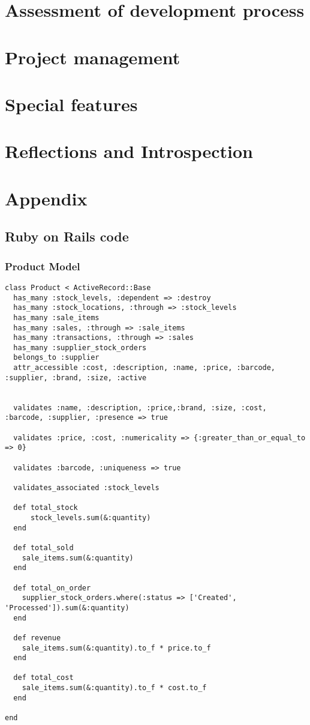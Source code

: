 \documentclass[a4paper]{article}
\begin{document}
\section{Assessment of development process}
\pagebreak
\section{Project management}
\pagebreak
\section{Special features}
\pagebreak
\section{Reflections and Introspection}
\pagebreak


\section{Appendix}






\subsection{Ruby on Rails code}

\subsubsection{Product Model}
\begin{verbatim}
class Product < ActiveRecord::Base
  has_many :stock_levels, :dependent => :destroy
  has_many :stock_locations, :through => :stock_levels
  has_many :sale_items
  has_many :sales, :through => :sale_items
  has_many :transactions, :through => :sales
  has_many :supplier_stock_orders
  belongs_to :supplier
  attr_accessible :cost, :description, :name, :price, :barcode, :supplier, :brand, :size, :active


  validates :name, :description, :price,:brand, :size, :cost, :barcode, :supplier, :presence => true

  validates :price, :cost, :numericality => {:greater_than_or_equal_to => 0}

  validates :barcode, :uniqueness => true

  validates_associated :stock_levels

  def total_stock
      stock_levels.sum(&:quantity)
  end

  def total_sold
    sale_items.sum(&:quantity)
  end

  def total_on_order
    supplier_stock_orders.where(:status => ['Created', 'Processed']).sum(&:quantity)
  end

  def revenue
    sale_items.sum(&:quantity).to_f * price.to_f
  end

  def total_cost
    sale_items.sum(&:quantity).to_f * cost.to_f
  end

end

\end{verbatim}
\end{document}

